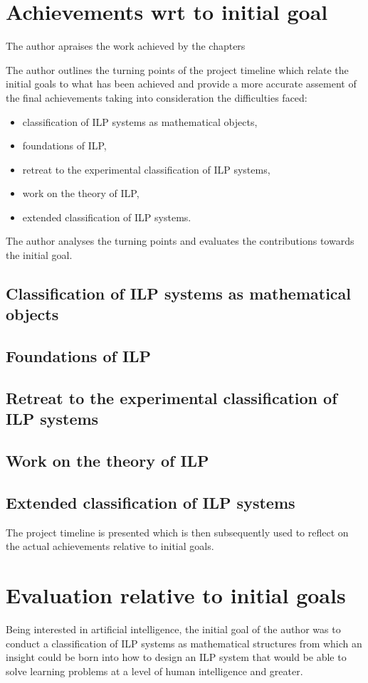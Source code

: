 
\section{Achievements wrt to initial goal}
The author apraises the work achieved by the chapters

The author outlines the turning points of the project timeline which relate the initial goals to what has been achieved and provide a more accurate assement of the final achievements taking into consideration the difficulties faced:

\begin{itemize}
\item classification of ILP systems as mathematical objects,
\item foundations of ILP,
\item retreat to the experimental classification of ILP systems,
\item work on the theory of ILP,
\item extended classification of ILP systems.
\end{itemize}

The author analyses the turning points and evaluates the contributions towards the initial goal.

\subsection{Classification of ILP systems as mathematical objects}
\subsection{Foundations of ILP}
\subsection{Retreat to the experimental classification of ILP systems}
\subsection{Work on the theory of ILP}
\subsection{Extended classification of ILP systems}

The project timeline is presented which is then subsequently used to reflect on the actual achievements relative to initial goals.

\section{Evaluation relative to initial goals}
Being interested in artificial intelligence, the initial goal of the author was to conduct a classification of ILP systems as mathematical structures from which an insight could be born into how to design an ILP system that would be able to solve learning problems at a level of human intelligence and greater.


